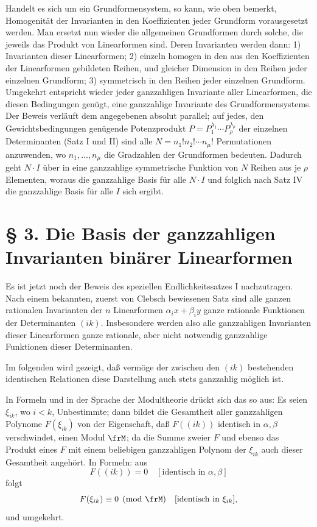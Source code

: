\documentclass[11pt]{article}
\begin{document}
Handelt es sich um ein Grundformensystem, so kann, wie oben bemerkt, Homogenität der Invarianten in den Koeffizienten jeder Grundform vorausgesetzt werden. Man ersetzt nun wieder die allgemeinen Grundformen durch solche, die jeweils das Produkt von Linearformen sind. Deren Invarianten werden dann: 1) Invarianten dieser Linearformen; 2) einzeln homogen in den aus den Koeffizienten der Linearformen gebildeten Reihen, und gleicher Dimension in den Reihen jeder einzelnen Grundform; 3) symmetrisch in den Reihen jeder einzelnen Grundform. Umgekehrt entspricht wieder jeder ganzzahligen Invariante aller Linearformen, die diesen Bedingungen genügt, eine ganzzahlige Invariante des Grundformensystems. Der Beweis verläuft dem angegebenen absolut parallel; auf jedes, den Gewichtsbedingungen genügende Potenzprodukt \(P=P_1^{\lambda_1}\cdots P_\rho^{\lambda_\rho}\) der einzelnen Determinanten (Satz I und II) sind alle \(N=n_1!n_2!\cdots n_\mu!\) Permutationen anzuwenden, wo \(n_1,\ldots,n_\mu\) die Gradzahlen der Grundformen bedeuten. Dadurch geht \(N\cdot I\) über in eine ganzzahlige symmetrische Funktion von \(N\) Reihen aus je \(\rho\) Elementen, woraus die ganzzahlige Basis für alle \(N\cdot I\) und folglich nach Satz IV die ganzzahlige Basis für alle \(I\) sich ergibt.

\setcounter{equation}{0}
\section*{§ 3. Die Basis der ganzzahligen Invarianten binärer Linearformen}

Es ist jetzt noch der Beweis des speziellen Endlichkeitssatzes I nachzutragen. Nach einem bekannten, zuerst von Clebsch bewiesenen Satz sind alle ganzen rationalen Invarianten der \(n\) Linearformen \(\alpha_i x+\beta_i y\) ganze rationale Funktionen der Determinanten \((ik)\). Insbesondere werden also alle ganzzahligen Invarianten dieser Linearformen ganze rationale, aber nicht notwendig ganzzahlige Funktionen dieser Determinanten.

Im folgenden wird gezeigt, daß vermöge der zwischen den \((ik)\) bestehenden identischen Relationen diese Darstellung auch stets ganzzahlig möglich ist.

In Formeln und in der Sprache der Modultheorie drückt sich das so aus: Es seien \(\xi_{ik}\), wo \(i<k\), Unbestimmte; dann bildet die Gesamtheit aller ganzzahligen Polynome \(F(\xi_{ik})\) von der Eigenschaft, daß \(F((ik))\) identisch in \(\alpha,\beta\) verschwindet, einen Modul \(\frM\); da die Summe zweier \(F\) und ebenso das Produkt eines \(F\) mit einem beliebigen ganzzahligen Polynom der \(\xi_{ik}\) auch dieser Gesamtheit angehört. In Formeln: aus
\[
        F((ik))=0\quad [\text{identisch in \(\alpha,\beta\)}]
\]
folgt
\[
        F(\xi_{ik})\equiv0\pmod{\frM}\quad [\text{identisch in \(\xi_{ik}\)}],
\]
und umgekehrt.
\end{document}
